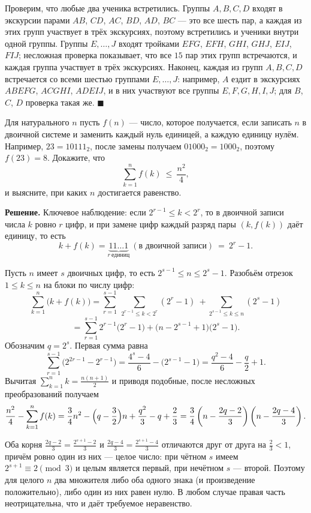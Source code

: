 Проверим, что любые два ученика встретились. Группы $A,B,C,D$ входят в экскурсии парами $AB$, $CD$, $AC$, $BD$, $AD$, $BC$ --- это все шесть пар, а каждая из этих групп участвует в трёх экскурсиях, поэтому встретились и ученики внутри одной группы. Группы $E,\dots,J$ входят тройками $EFG$, $EFH$, $GHI$, $GHJ$, $EIJ$, $FIJ$; несложная проверка показывает, что все $15$ пар этих групп встречаются, и каждая группа участвует в трёх экскурсиях. Наконец, каждая из групп $A,B,C,D$ встречается со всеми шестью группами $E,\dots,J$: например, $A$ ездит в экскурсиях $ABEFG$, $ACGHI$, $ADEIJ$, и в них участвуют все группы $E,F,G,H,I,J$; для $B$, $C$, $D$ проверка такая же. \hfill$\blacksquare$
\fi

\q Для натурального $n$ пусть $f(n)$ --- число, которое получается, если записать $n$ в двоичной системе и заменить каждый нуль единицей, а каждую единицу нулём. Например, $23=10111_2$, после замены получаем $01000_2=1000_2$, поэтому $f(23)=8$. Докажите, что
\[
\sum_{k=1}^{n} f(k)\ \le\ \frac{n^2}{4},
\]
и выясните, при каких $n$ достигается равенство.

\if{}
\textbf{Решение.} Ключевое наблюдение: если $2^{r-1}\le k<2^{r}$, то в двоичной записи числа $k$ ровно $r$ цифр, и при замене цифр каждый разряд пары $(k,f(k))$ даёт единицу, то есть
\[
k+f(k)=\underbrace{11\ldots1}_{r\ \text{единиц}}\ (\text{в двоичной записи})\ =\ 2^r-1 .
\]

Пусть $n$ имеет $s$ двоичных цифр, то есть $2^{s-1}\le n\le 2^{s}-1$. Разобьём отрезок $1\le k\le n$ на блоки по числу цифр:
\[
\sum_{k=1}^{n}\bigl(k+f(k)\bigr)
=\sum_{r=1}^{s-1}\ \sum_{2^{r-1}\le k<2^{r}}(2^r-1)\ +\sum_{2^{s-1}\le k\le n}(2^s-1)
\]
\[
=\sum_{r=1}^{s-1}2^{r-1}\bigl(2^r-1\bigr)+\bigl(n-2^{s-1}+1\bigr)\bigl(2^s-1\bigr).
\]
Обозначим $q=2^s$. Первая сумма равна
\[
\sum_{r=1}^{s-1}\bigl(2^{2r-1}-2^{r-1}\bigr)=\frac{4^{s}-4}{6}-\bigl(2^{s-1}-1\bigr)=\frac{q^2-4}{6}-\frac q2+1 .
\]
Вычитая $\sum_{k=1}^n k=\frac{n(n+1)}2$ и приводя подобные, после несложных преобразований получаем
\[
\frac{n^2}{4}-\sum_{k=1}^{n}f(k)
=\frac34 n^2-\Bigl(q-\frac32\Bigr)n+\frac{q^2}{3}-q+\frac23
=\frac34\left(n-\frac{2q-2}{3}\right)\left(n-\frac{2q-4}{3}\right).
\]

Оба корня $\frac{2q-2}{3}=\frac{2^{s+1}-2}{3}$ и $\frac{2q-4}{3}=\frac{2^{s+1}-4}{3}$ отличаются друг от друга на $\frac23<1$, причём ровно один из них --- целое число: при чётном $s$ имеем $2^{s+1}\equiv2\pmod 3$ и целым является первый, при нечётном $s$ --- второй. Поэтому для целого $n$ два множителя либо оба одного знака (и произведение положительно), либо один из них равен нулю. В любом случае правая часть неотрицательна, что и даёт требуемое неравенство.

